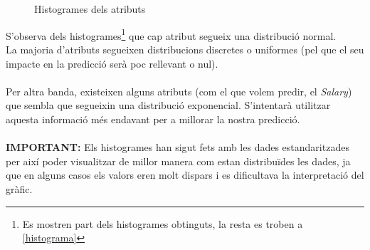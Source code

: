 \documentclass[a4paper, 11pt]{article}
\begin{document}
\begin{figure}[h]
 \\
 \centering
    \\
  \caption{Histogrames dels atributs}
\end{figure}
\hspace{-1.8 em}
S'observa dels histogrames\footnote{Es mostren part dels histogrames obtinguts, la resta es troben a \textcolor{blue}{\ref{histograma}}} que cap atribut segueix una distribució normal.\\
La majoria d'atributs segueixen distribucions discretes o uniformes (pel que el seu impacte en la predicció serà poc rellevant o nul).\\\\
Per altra banda, existeixen alguns atributs (com el que volem predir, el \textit{Salary}) que sembla que segueixin una distribució exponencial. S'intentarà utilitzar aquesta informació més endavant per a millorar la nostra predicció.\\\\
\textbf{IMPORTANT:} Els histogrames han sigut fets amb les dades estandaritzades per així poder visualitzar de millor manera com estan distribuïdes les dades, ja que en alguns casos els valors eren molt dispars i es dificultava la interpretació del gràfic.
\newpage
\end{document}
